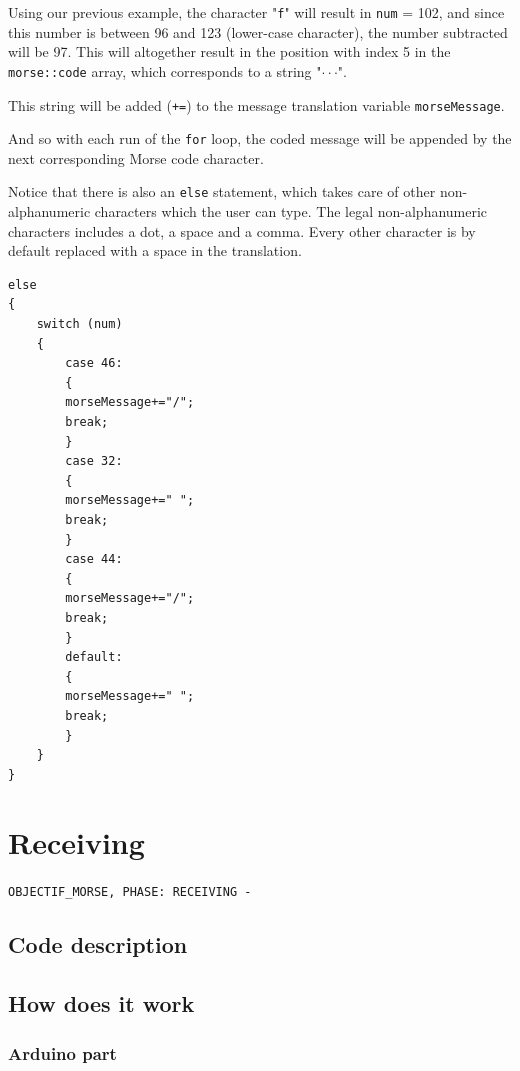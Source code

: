 \documentclass[12pt]{report}
\begin{document}
Using our previous example, the character "\verb|f|" will result in \verb|num| = 102, and since this number is between 96 and 123 (lower-case character), the number subtracted will be 97. This will altogether result in the position with index 5 in the \verb|morse::code| array, which corresponds to a string "$\cdot\cdot$\text{-}$\cdot$". 

This string will be added (\verb|+=|) to the message translation variable \verb|morseMessage|.

And so with each run of the \verb|for| loop, the coded message will be appended by the next corresponding Morse code character.

Notice that there is also an \verb|else| statement, which takes care of other non-alphanumeric characters which the user can type. The legal non-alphanumeric characters includes a dot, a space and a comma. Every other character is by default replaced with a space in the translation.


\begin{snugshade}
\begin{verbatim}
else
{
	switch (num)
	{
		case 46:
		{
		morseMessage+="/";
		break;
		}
		case 32:
		{
		morseMessage+=" ";
		break;
		}
		case 44:
		{
		morseMessage+="/";
		break;
		}
		default:
		{
		morseMessage+=" ";
		break;
		}
	}
}
\end{verbatim}
\end{snugshade}


\newpage

\chapter{Receiving}

\verb|OBJECTIF_MORSE, PHASE: RECEIVING -|


\section{Code description}


\section{How does it work}





\subsection{Arduino part}
\end{document}
